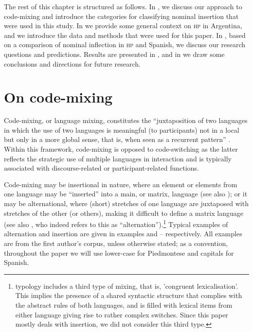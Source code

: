 \documentclass[output=paper]{langscibook}
\begin{document}
The rest of this chapter is structured as follows. In , we discuss our approach to code-mixing and introduce the categories for classifying nominal insertion that were used in this study. In  we provide some general context on \textsc{hp} in Argentina, and we introduce the data and methods that were used for this paper. In , based on a comparison of nominal inflection in \textsc{hp} and Spanish, we discuss our research questions and predictions. Results are presented in , and in  we draw some conclusions and directions for future research.

\section{On code-mixing}\label{sec:goria:2}

Code-mixing, or language mixing, constitutes the “juxtaposition of two languages in which the use of two languages is meaningful (to participants) not in a local but only in a more global sense, that is, when seen as a recurrent pattern” \citep[310]{Auer1999}. Within this framework, code-mixing is opposed to code-switching as the latter reflects the strategic use of multiple languages in interaction and is typically associated with discourse-related or participant-related functions.

Code-mixing may be insertional in nature, where an element or elements from one language may be “inserted” into a main, or matrix, language (see also \citealt{Myers-Scotton1993duelling,Myers-Scotton2002,Muysken2000}); or it may be alternational, where (short) stretches of one language are juxtaposed with stretches of the other (or others), making it difficult to define a matrix language (see also \citealt{Muysken2000}, who indeed refers to this as “alternation”).\footnote{ typology includes a third type of mixing, that is, 'congruent lexicalisation'. This implies the presence of a shared syntactic structure that complies with the abstract rules of both languages, and is filled with lexical items from either language giving rise to rather complex switches. Since this paper mostly deals with insertion, we did not consider this third type.} Typical examples of alternation and insertion are given in examples  and -- respectively. All examples are from the first author’s corpus, unless otherwise stated; as a convention, throughout the paper we will use lower-case for Piedmontese and capitals for Spanish.
\end{document}
